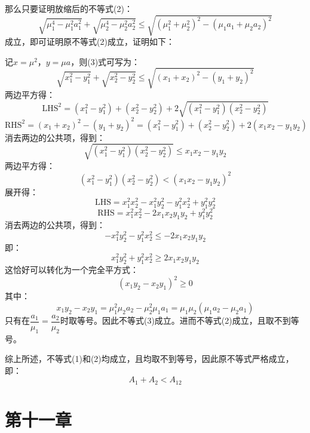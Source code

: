 \documentclass[a4paper]{article}
\begin{document}
\begin{enumerate}
    那么只要证明放缩后的不等式(2)：
    \begin{equation}
        \sqrt{\mu_1^4 - \mu_1^2 a_1^2} + \sqrt{\mu_2^4 - \mu_2^2 a_2^2} \leqslant \sqrt{(\mu_1^2 + \mu_2^2)^2 - (\mu_1 a_1 + \mu_2 a_2)^2}
    \end{equation}
    成立，即可证明原不等式(2)成立，证明如下：

    记$x = \mu^2$，$y = \mu a$，则(3)式可写为：
    \[
        \sqrt{x_1^2 - y_1^2} + \sqrt{x_2^2 - y_2^2} \leqslant \sqrt{(x_1 + x_2)^2 - (y_1 + y_2)^2}
    \]
    两边平方得：
    \[
        \mathrm{LHS}^2 = (x_1^2 - y_1^2) + (x_2^2 - y_2^2) + 2\sqrt{(x_1^2 - y_1^2)(x_2^2 - y_2^2)}
    \]
    \[
        \mathrm{RHS}^2 = (x_1 + x_2)^2 - (y_1 + y_2)^2 = (x_1^2 - y_1^2) + (x_2^2 - y_2^2) + 2(x_1 x_2 - y_1 y_2)
    \]
    消去两边的公共项，得到：
    \[
        \sqrt{(x_1^2 - y_1^2)(x_2^2 - y_2^2)} \leqslant x_1 x_2 - y_1 y_2
    \]
    两边平方得：
    \[
        (x_1^2 - y_1^2)(x_2^2 - y_2^2) < (x_1 x_2 - y_1 y_2)^2
    \]
    展开得：
    \[
        \mathrm{LHS} = x_1^2 x_2^2 - x_1^2 y_2^2 - y_1^2 x_2^2 + y_1^2 y_2^2
    \]
    \[
        \mathrm{RHS} = x_1^2 x_2^2 - 2x_1 x_2 y_1 y_2 + y_1^2 y_2^2
    \]
    消去两边的公共项，得到：
    \[
        -x_1^2 y_2^2 - y_1^2 x_2^2 \leqslant -2x_1 x_2 y_1 y_2
    \]
    即：
    \[
        x_1^2 y_2^2 + y_1^2 x_2^2 \geqslant 2x_1 x_2 y_1 y_2
    \]
    这恰好可以转化为一个完全平方式：
    \[
        (x_1 y_2 - x_2 y_1)^2 \geqslant 0
    \]
    其中：
    \[
        x_1 y_2 - x_2 y_1 = \mu_1^2 \mu_2 a_2 - \mu_2^2 \mu_1 a_1 = \mu_1 \mu_2 (\mu_1 a_2 - \mu_2 a_1)
    \]
    只有在$\dfrac{a_1}{\mu_1} = \dfrac{a_2}{\mu_2}$时取等号。因此不等式(3)成立。进而不等式(2)成立，且取不到等号。

    综上所述，不等式(1)和(2)均成立，且均取不到等号，因此原不等式严格成立，即：
    \[
        A_1 + A_2 < A_{12}
    \]
\end{enumerate}

\section*{第十一章}
\end{document}
